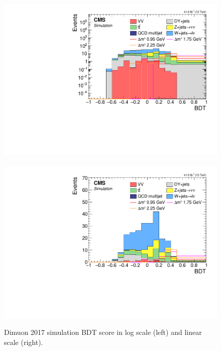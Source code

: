 \begin{figure}[!htb]
\centering
\includegraphics[width=0.48\linewidth]{plots/dilepton_muons_2017/none_custom_dilepBDTCorrJetNoMultIso10Dr0.6_log.pdf} \,
\includegraphics[width=0.48\linewidth]{plots/dilepton_muons_2017/none_custom_dilepBDTCorrJetNoMultIso10Dr0.6.pdf} \\


\caption[Dimuon simulation BDT output]{Dimuon 2017 simulation BDT score in log scale (left) and linear scale (right).}
\label{fig:dimuon-bdt-sim-output}
\end{figure}

